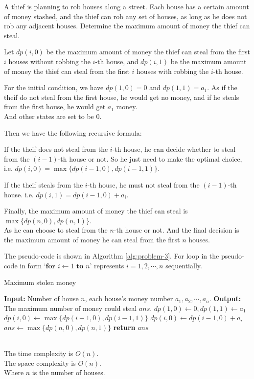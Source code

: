 \problem{}
A thief is planning to rob houses along a street. Each house has a certain amount of money stashed, and the thief can rob any set of houses, as long as he does not rob any adjacent houses.  Determine the maximum amount of money the thief can steal.

\solution{}

Let $dp(i,0)$ be the maximum amount of money the thief can steal from the first $i$ houses without robbing the $i$-th house, and $dp(i,1)$ be the maximum amount of money the thief can steal from the first $i$ houses with robbing the $i$-th house.

For the initial condition, we have $dp(1,0)=0$ and $dp(1,1)=a_1$. As if the theif do not steal from the first house, he would get no money, and if he steals from the first house, he would get $a_1$ money.\\
And other states are set to be $0$.

Then we have the following recursive formula:

If the theif does not steal from the $i$-th house, he can decide whether to steal from the $(i-1)$-th house or not. So he just need to make the optimal choice,
i.e. $dp(i,0)=\max\{dp(i-1,0),dp(i-1,1)\}$.

If the theif steals from the $i$-th house, he must not steal from the $(i-1)$-th house. i.e. $dp(i,1)=dp(i-1,0)+a_i$.

Finally, the maximum amount of money the thief can steal is $\max\{dp(n,0),dp(n,1)\}$.\\
As he can choose to steal from the $n$-th house or not. And the final decision is the maximum amount of money he can steal from the first $n$ houses.

The pseudo-code is shown in Algorithm \ref{alg:problem-3}. For loop in the pseudo-code in form `$\textbf{for } i \gets 1 \textbf{ to } n$' represents $i=1,2,\cdots,n$ sequentially.
\begin{algorithm}
    \caption{Maximum stolen money}
    \begin{algorithmic}[1]
    \State \textbf{Input:} Number of house $n$, each house's money number $a_1, a_2, \cdots, a_n$. 
    \State \textbf{Output:} The maximum number of money could steal $ans$.
    \State $dp(1,0) \gets 0, dp(1,1)\gets a_1$
        \State $dp(i,0) \gets \max\{dp(i-1,0),dp(i-1,1)\}$
        \State $dp(i,0) \gets dp(i-1,0)+a_i$
    \EndFor
    \State $ans \gets \max\{dp(n,0),dp(n,1)\}$
    \State \textbf{return} $ans$
    \end{algorithmic}
    \label{alg:problem-3}
\end{algorithm}\\
The time complexity is $O(n)$.\\
The space complexity is $O(n)$.\\
Where $n$ is the number of houses.\\

\newpage